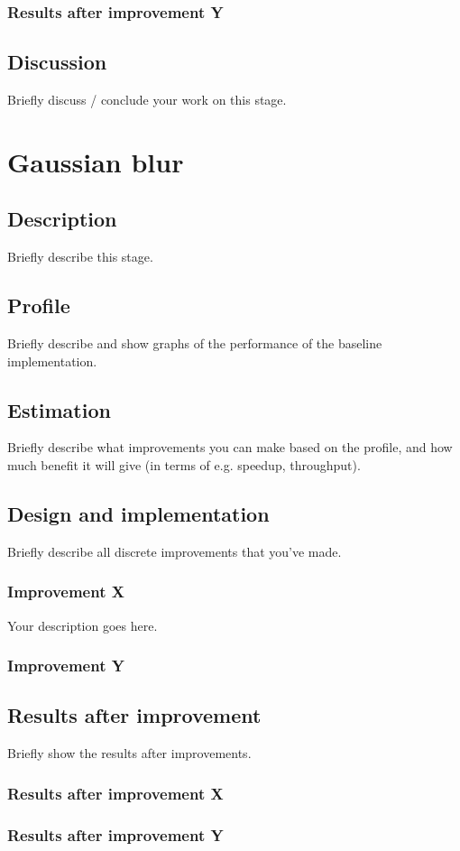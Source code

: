 \documentclass[twocolumn]{article}
\begin{document}
\subsubsection{Results after improvement Y}
\subsection{Discussion}
Briefly discuss / conclude your work on this stage.

\section{Gaussian blur}
\subsection{Description}
Briefly describe this stage.
\subsection{Profile}
Briefly describe and show graphs of the performance of the baseline implementation.
\subsection{Estimation}
Briefly describe what improvements you can make based on the profile, and how much benefit it will give (in terms of e.g. speedup, throughput).
\subsection{Design and implementation}
Briefly describe all discrete improvements that you've made.
\subsubsection{Improvement X}
Your description goes here.
\subsubsection{Improvement Y}
\subsection{Results after improvement}
Briefly show the results after improvements.
\subsubsection{Results after improvement X}
\subsubsection{Results after improvement Y}
\end{document}
